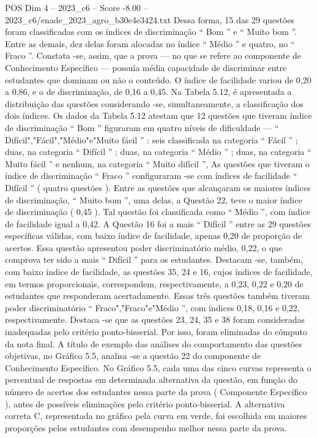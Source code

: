 \begin{textsample}{POS Dim 4 – 2023\_c6 – Score -8.00 – 2023\_c6/enade\_2023\_agro\_b30e4e3424.txt}
Dessa forma, 15 das 29 questões foram classificadas com os índices de discriminação “ Bom ” e “ Muito bom ”.
Entre as demais, dez delas foram alocadas no índice “ Médio ” e quatro, no “ Fraco ”.
Constata -se, assim, que a prova — no que se refere ao componente de Conhecimento Específico — possuía média capacidade de discriminar entre estudantes que dominam ou não o conteúdo.
O índice de facilidade variou de 0,20 a 0,86, e o de discriminação, de 0,16 a 0,45.
Na Tabela 5.12, é apresentada a distribuição das questões considerando -se, simultaneamente, a classificação dos dois índices.
Os dados da Tabela 5.12 atestam que 12 questões que tiveram índice de discriminação “ Bom ” figuraram em quatro níveis de dificuldade — “ Difícil","Fácil","Médio"e"Muito fácil ” : seis classificada na categoria “ Fácil ” ; duas, na categoria “ Difícil ” ; duas, na categoria “ Médio ” ; duas, na categoria “ Muito fácil ” e nenhum, na categoria “ Muito difícil ”, As questões que tiveram o índice de discriminação “ Fraco ” configuraram -se com índices de facilidade “ Difícil ” ( quatro questões ).
Entre as questões que alcançaram os maiores índices de discriminação, “ Muito bom ”, uma delas, a Questão 22, teve o maior índice de discriminação ( 0,45 ).
Tal questão foi classificada como “ Médio ”, com índice de facilidade igual a 0,42.
A Questão 16 foi a mais “ Difícil ” entre as 29 questões específicas válidas, com baixo índice de facilidade, apenas 0,20 de proporção de acertos.
Essa questão apresentou poder discriminatório médio, 0,22, o que comprova ter sido a mais “ Difícil ” para os estudantes.
Destacam -se, também, com baixo índice de facilidade, as questões 35, 24 e 16, cujos índices de facilidade, em termos proporcionais, correspondem, respectivamente, a 0,23, 0,22 e 0,20 de estudantes que responderam acertadamente.
Essas três questões também tiveram poder discriminatório “ Fraco","Fraco"e"Médio ”, com índices 0,18, 0,16 e 0,22, respectivamente.
Destaca -se que as questões 23, 24, 35 e 38 foram consideradas inadequadas pelo critério ponto-bisserial.
Por isso, foram eliminadas do cômputo da nota final.
A título de exemplo das análises do comportamento das questões objetivas, no Gráfico 5.5, analisa -se a questão 22 do componente de Conhecimento Específico.
No Gráfico 5.5, cada uma das cinco curvas representa o percentual de respostas em determinada alternativa da questão, em função do número de acertos dos estudantes nessa parte da prova ( Componente Específico ), antes de possíveis eliminações pelo critério ponto-bisserial.
A alternativa correta C, representada no gráfico pela curva em verde, foi escolhida em maiores proporções pelos estudantes com desempenho melhor nessa parte da prova.

\end{textsample}
